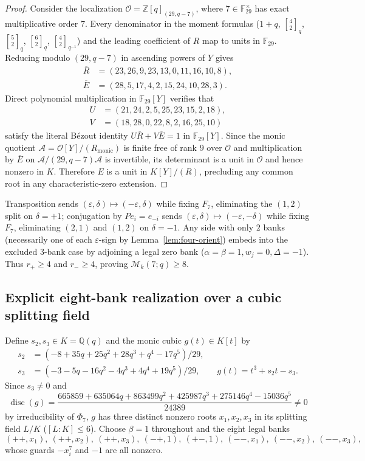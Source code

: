 \documentclass[11pt,reqno]{amsart}
\numberwithin{equation}{section}
\theoremstyle{definition}
\theoremstyle{remark}
\newcommand{\F}{\mathbb{F}}
\newcommand{\Q}{\mathbb{Q}}
\newcommand{\Z}{\mathbb{Z}}
\newcommand{\disc}{\operatorname{disc}}
\newcommand{\gb}[3]{\genfrac{[}{]}{0pt}{}{#1}{#2}_{#3}}
\newcommand{\eps}{\varepsilon}
\newcommand{\M}{\mathcal{M}}
\begin{document}
\begin{proof}
Consider the localization $\mathcal{O}=\Z[q]_{(29,q-7)}$, where $7\in\F_{29}^\times$ has exact multiplicative order $7$. Every denominator in the moment formulas ($1+q$, $\gb{4}{2}{q}$, $\gb{5}{2}{q}$, $\gb{6}{2}{q}$, $\gb{4}{2}{q^{-1}}$) and the leading coefficient of $R$ map to units in $\F_{29}$. Reducing modulo $(29,q-7)$ in ascending powers of $Y$ gives
\begin{align*}
\overline{R} &= (23,26,9,23,13,0,11,16,10,8),\\
\overline{E} &= (28,5,17,4,2,15,24,10,28,3).
\end{align*}
Direct polynomial multiplication in $\F_{29}[Y]$ verifies that
\begin{align*}
U &= (21,24,2,5,25,23,15,2,18),\\
V &= (18,28,0,22,8,2,16,25,10)
\end{align*}
satisfy the literal B\'ezout identity $U\overline{R} + V\overline{E} = 1$ in $\F_{29}[Y]$. Since the monic quotient $\mathcal{A}=\mathcal{O}[Y]/(R_{\mathrm{monic}})$ is finite free of rank $9$ over $\mathcal{O}$ and multiplication by $\overline{E}$ on $\mathcal{A}/(29,q-7)\mathcal{A}$ is invertible, its determinant is a unit in $\mathcal{O}$ and hence nonzero in $K$. Therefore $E$ is a unit in $K[Y]/(R)$, precluding any common root in any characteristic-zero extension.
\end{proof}

Transposition sends $(\eps,\delta)\mapsto(-\eps,\delta)$ while fixing $F_7$, eliminating the $(1,2)$ split on $\delta=+1$; conjugation by $Pe_i=e_{-i}$ sends $(\eps,\delta)\mapsto(-\eps,-\delta)$ while fixing $F_7$, eliminating $(2,1)$ and $(1,2)$ on $\delta=-1$. Any side with only $2$ banks (necessarily one of each $\eps$-sign by Lemma~\ref{lem:four-orient}) embeds into the excluded $3$-bank case by adjoining a legal zero bank ($\alpha=\beta=1, w_j=0, \Delta=-1$). Thus $r_+\ge 4$ and $r_-\ge 4$, proving $\M_k(7;q)\ge 8$.

\subsection{Explicit eight-bank realization over a cubic splitting field}
\label{sec:n7upper}

Define $s_2, s_3\in K=\Q(q)$ and the monic cubic $g(t)\in K[t]$ by
\begin{align}
s_2 &= (-8 + 35q + 25q^2 + 28q^3 + q^4 - 17q^5)/29, \nonumber\\
s_3 &= (-3 - 5q - 16q^2 - 4q^3 + 4q^4 + 19q^5)/29, \qquad g(t) = t^3 + s_2 t - s_3. \label{eq:n7-cubic}
\end{align}
Since $s_3\ne 0$ and
\[
\disc(g) = \frac{665859 + 635064q + 863499q^2 + 425987q^3 + 275146q^4 - 15036q^5}{24389} \ne 0
\]
by irreducibility of $\Phi_7$, $g$ has three distinct nonzero roots $x_1,x_2,x_3$ in its splitting field $L/K$ ($[L:K]\le 6$). Choose $\beta=1$ throughout and the eight legal banks
\begin{equation}
\label{eq:n7-banks}
(++,x_1),\ (++,x_2),\ (++,x_3),\ (-+,1),\ (+-,1),\ (--,x_1),\ (--,x_2),\ (--,x_3),
\end{equation}
whose guards $-x_i^7$ and $-1$ are all nonzero.
\end{document}
